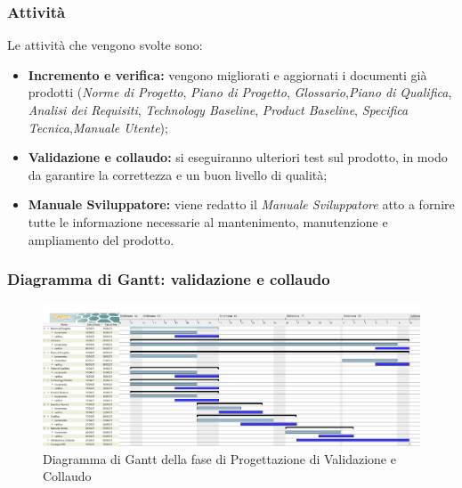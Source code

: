\subsubsection{Attività}
Le attività che vengono svolte sono:
\begin{itemize}
	\item \textbf{Incremento e verifica:} vengono migliorati e aggiornati i documenti già prodotti (\textit{Norme di Progetto}, \textit{Piano di Progetto}, \textit{Glossario},\textit{Piano di Qualifica}, \textit{Analisi dei Requisiti}, \textit{Technology Baseline}, \textit{Product Baseline}, \textit{Specifica Tecnica},\textit{Manuale Utente});
	\item \textbf{Validazione e collaudo:} si eseguiranno ulteriori test sul prodotto, in modo da garantire la correttezza e un buon livello di qualità;
	\item \textbf{Manuale Sviluppatore:} viene redatto il \textit{Manuale Sviluppatore} atto a fornire tutte le informazione necessarie al mantenimento, manutenzione e ampliamento del prodotto.
\end{itemize}
\subsubsection{Diagramma di Gantt: validazione e collaudo}
\begin{figure}[H]
    \centering
    \includegraphics[scale = 0.25]{components/img/validazione_collaudo.jpg}
    \caption{Diagramma di Gantt della fase di Progettazione di Validazione e Collaudo}
    \label{fig:Diagramma di Gantt, fase di Validazione e collaudo}
\end{figure}
